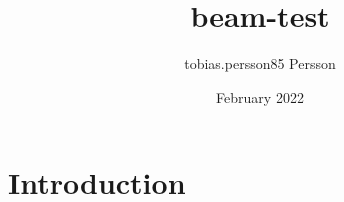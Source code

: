 \documentclass{article}
\title{beam-test}
\author{tobias.persson85 Persson}
\date{February 2022}
\begin{document}
\maketitle

\section{Introduction}
\end{document}
